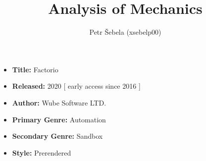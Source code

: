 \documentclass[a4paper,10pt,english]{article}
\title{%
Analysis of Mechanics%
}
\author{%
Petr Šebela (xsebelp00)%
}
\date{}
\begin{document}
\maketitle
\thispagestyle{empty}

{%
\large

\begin{itemize}

\item[] \textbf{Title:} Factorio

\item[] \textbf{Released:} 2020 [ early access since 2016 ]

\item[] \textbf{Author:} Wube Software LTD.

\item[] \textbf{Primary Genre:} Automation

\item[] \textbf{Secondary Genre:} Sandbox

\item[] \textbf{Style:} Prerendered

\end{itemize}

}
\end{document}
